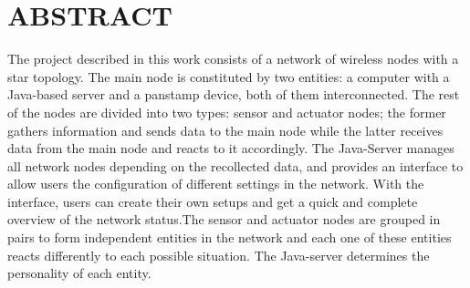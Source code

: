 \section{ABSTRACT}
The project described in this work consists of a network of wireless nodes with a star topology. The main node is constituted by two entities: a computer with a Java-based server and a panstamp device, both of them interconnected. The rest of the nodes are divided into two types: sensor and actuator nodes; the former gathers information and sends data to the main node while the latter receives data from the main node and reacts to it accordingly. The Java-Server manages all network nodes depending on the recollected data, and provides an interface to allow users the configuration of different settings in the network. With the interface, users can create their own setups and get a quick and complete overview of the network status.The sensor and actuator nodes are grouped in pairs to form independent entities in the network and each one
of these entities reacts differently to each possible situation. The Java-server determines the personality of each entity. 
